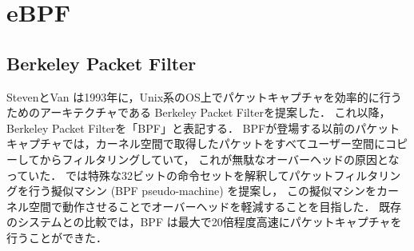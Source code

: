 \chapter{eBPF}
\section{Berkeley Packet Filter}
StevenとVan \cite{berkeley-packet-filter}は1993年に，Unix系のOS上でパケットキャプチャを効率的に行うためのアーキテクチャである
Berkeley Packet Filterを提案した．
これ以降，Berkeley Packet Filterを「BPF」と表記する．
BPFが登場する以前のパケットキャプチャでは，カーネル空間で取得したパケットをすべてユーザー空間にコピーしてからフィルタリングしていて，
これが無駄なオーバーヘッドの原因となっていた．
\cite{berkeley-packet-filter}では特殊な32ビットの命令セットを解釈してパケットフィルタリングを行う擬似マシン (BPF pseudo-machine) を提案し，
この擬似マシンをカーネル空間で動作させることでオーバーヘッドを軽減することを目指した．
既存のシステムとの比較では，BPF は最大で20倍程度高速にパケットキャプチャを行うことができた．

